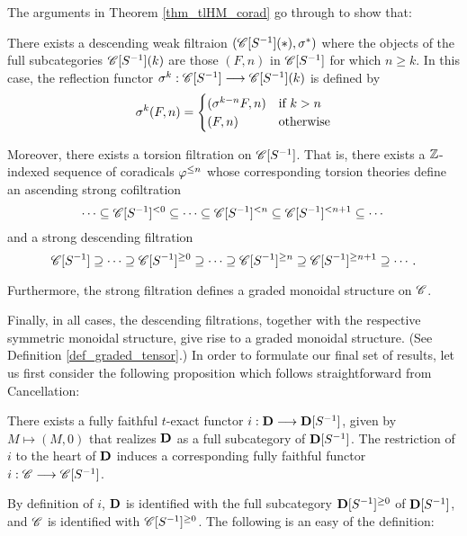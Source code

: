 The arguments in Theorem \ref{thm_tlHM_corad} go through to show that:

\begin{thm}
\label{thm_sum_heart_loc}
There exists a descending weak filtraion $(\SGFilt{*}{\CatLoc{C}{S}}, 
\sgHI{*})$ where the objects of the full subcategories 
$\SGFilt{k}{\CatLoc{C}{S}}$ are those $(F, n)$ in $\CatLoc{C}{S}$ for 
which $n \geq k$. In this case, the reflection functor 
$\sgHI{k}: \CatLoc{C}{S} \to \SGFilt{k}{\CatLoc{C}{S}}$ is defined by 
\[
\sgHI{k}(F,n) = \begin{cases}
(\sgHI{k - n}F, n) &\textrm{if }k > n\\
(F, n)             &\textrm{otherwise}
\end{cases}
\]

Moreover, there exists a torsion filtration on $\CatLoc{C}{S}$. 
That is, there exists a $\Z$-indexed sequence of coradicals $\corad{n}$ 
whose corresponding torsion theories define an ascending strong 
cofiltration
\[
\cdots \subseteq \Corad{0}{\CatLoc{C}{S}} \subseteq \cdots \subseteq 
   \Corad{n}{\CatLoc{C}{S}} \subseteq \Corad{n + 1}{\CatLoc{C}{S}}
   \subseteq \cdots
\]
and a strong descending filtration
\[
\CatLoc{C}{S} \supseteq \cdots \supseteq \Prerad{0}{\CatLoc{C}{S}}
   \supseteq \cdots \supseteq \Prerad{n}{\CatLoc{C}{S}} \supseteq 
   \Prerad{n + 1}{\CatLoc{C}{S}} \supseteq \cdots.
\]

Furthermore, the strong filtration defines a graded monoidal 
structure on $\Cat{C}$.
\end{thm}
\noproof

Finally, in all cases, the descending filtrations, together with
the respective symmetric monoidal structure, give rise to a
graded monoidal structure. (See Definition \ref{def_graded_tensor}.) In order
to formulate our final set of results, let us first consider the
following proposition which follows straightforward from 
Cancellation:

\begin{prop}
There exists a fully faithful $t$-exact functor $i: \DCat \to 
\DCatLoc{S}$, given by $M \mapsto (M, 0)$ that realizes $\DCat$ 
as a full subcategory of $\DCatLoc{S}$. The restriction of $i$ 
to the heart of $\DCat$ induces a corresponding fully faithful 
functor $i : \Cat{C} \to \CatLoc{C}{S}$.
\end{prop}

By definition of $i$, $\DCat$ is identified with the full 
subcategory $\Prerad{0}{\DCatLoc{S}}$ of $\DCatLoc{S}$, and
$\Cat{C}$ is identified with $\Prerad{0}{\CatLoc{C}{S}}$.
The following is an easy of the definition:

